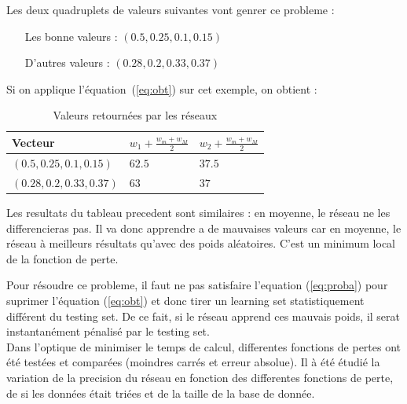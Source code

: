 \exemle
{
Les deux quadruplets de valeurs suivantes vont genrer ce probleme :
\begin{itemize}
    \item[Les bonne valeurs :] $(0.5, 0.25, 0.1, 0.15)$
    \item[D'autres valeurs :] $(0.28, 0.2, 0.33, 0.37)$
\end{itemize}
Si on applique l'équation\ (\ref{eq:obt}) sur cet exemple, on obtient :
\begin{table}[H]
    \centering
    \begin{tabular}{|l|l|l|}
        \hline
        Vecteur & $w_1 + \frac{w_m + w_M}{2}$ & $w_2 + \frac{w_m + w_M}{2}$ \\ \hline \hline
        $(0.5, 0.25, 0.1, 0.15)$  & $62.5$ & $37.5$ \\ \hline
        $(0.28, 0.2, 0.33, 0.37)$ &  $63$  &  $37$  \\ \hline
    \end{tabular}
    \label{tab:pb_tab}
    \caption{Valeurs retournées par les réseaux}
\end{table}
Les resultats du tableau precedent sont similaires :
en moyenne, le réseau ne les differencieras pas.
Il va donc apprendre a de mauvaises valeurs
car en moyenne, le réseau à meilleurs résultats qu'avec des poids aléatoires.
C'est un minimum local de la fonction de perte.
}


Pour résoudre ce probleme, il faut ne pas satisfaire l'equation (\ref{eq:proba})
pour suprimer l'équation (\ref{eq:obt}) et donc tirer un learning
set statistiquement différent du testing set.
De ce fait, si le réseau apprend ces mauvais poids, il serat instantanément pénalisé par le testing set.\\


Dans l'optique de minimiser le temps de calcul,
differentes fonctions de pertes ont été testées et comparées
(moindres carrés et erreur absolue).
Il à été étudié la variation de la precision du réseau en fonction des differentes fonctions de perte,
de si les données était triées et de la taille de la base de donnée.
